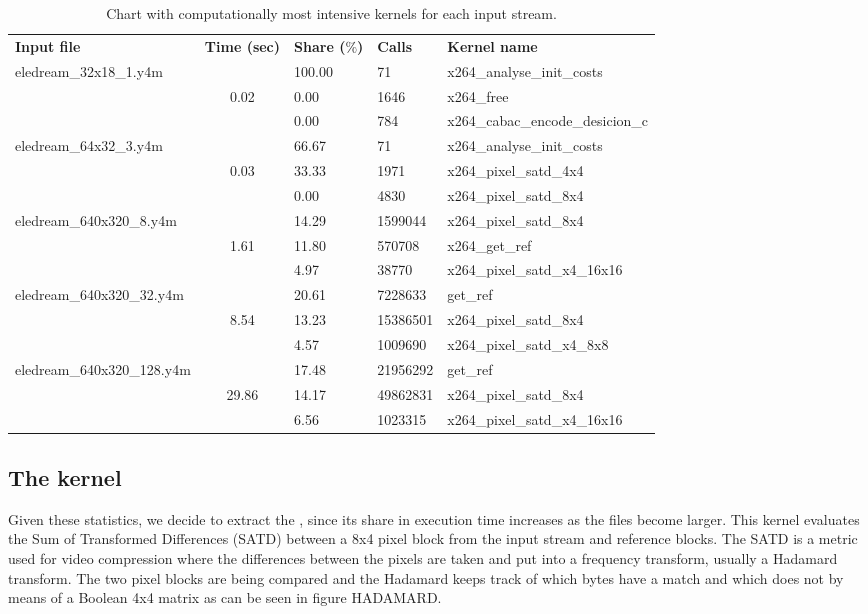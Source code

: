 % 
\begin{table}[htb]%
\centering
\small
	\begin{tabular}{lclll}
		\centering
		\bf{Input file} & \bf{Time (sec)} 	& \bf{Share ($\%$)} & \bf{Calls}	& \bf{Kernel name} \\ \cline{1-4}
		\multirow{3}{*}{eledream\_32x18\_1.y4m}	&				& 100.00	& 71		&	x264\_analyse\_init\_costs\\ 
																						&	0.02	& 0.00 		& 1646	&	x264\_free\\ 
																						&				& 0.00		& 784		&	x264\_cabac\_encode\_desicion\_c\\ \cline{1-5}
		\multirow{3}{*}{eledream\_64x32\_3.y4m} & 			& 66.67		& 71		& x264\_analyse\_init\_costs\\
																						&	0.03	& 33.33 	& 1971	&	x264\_pixel\_satd\_4x4\\ 
																						&				& 0.00		& 4830	&	x264\_pixel\_satd\_8x4\\ \cline{1-5}
		\multirow{3}{*}{eledream\_640x320\_8.y4m}	& 			& 14.29	& 1599044		&	x264\_pixel\_satd\_8x4\\ 
																							&	1.61	& 11.80 	& 570708	&	x264\_get\_ref\\ 
																							&				& 4.97		& 38770		&	x264\_pixel\_satd\_x4\_16x16\\ \cline{1-5}
		\multirow{3}{*}{eledream\_640x320\_32.y4m}& 			& 20.61		& 7228633		&	get\_ref\\ 
																							& 8.54	& 13.23 	& 15386501	&	x264\_pixel\_satd\_8x4\\ 
																							&				& 4.57		& 1009690		&	x264\_pixel\_satd\_x4\_8x8\\ \cline{1-5}
		\multirow{3}{*}{eledream\_640x320\_128.y4m}&			& 17.48		& 21956292	&	get\_ref\\
																							&	 29.86& 14.17 	& 49862831	&	x264\_pixel\_satd\_8x4\\
																							&				& 6.56		& 1023315		&	x264\_pixel\_satd\_x4\_16x16\\ \cline{1-5}
	\end{tabular}	
\caption{Chart with computationally most intensive kernels for each input stream.}
\label{tab:chart}
\end{table}

\subsection{The  kernel}
Given these statistics, we decide to extract the , since its share in execution time increases as the files become larger. This kernel evaluates the Sum of Transformed Differences (SATD) between a 8x4 pixel block from the input stream and reference blocks. The SATD is a metric used for video compression where the differences between the pixels are taken and put into a frequency transform, usually a Hadamard transform. The two pixel blocks are being compared and the Hadamard keeps track of which bytes have a match and which does not by means of a Boolean 4x4 matrix as can be seen in figure HADAMARD.

